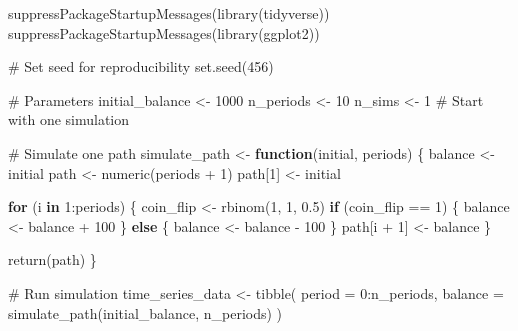 \documentclass[
  letterpaper,
  DIV=11,
  numbers=noendperiod]{scrartcl}
\newenvironment{Shaded}{\begin{snugshade}}{\end{snugshade}}
\newcommand{\AttributeTok}[1]{\textcolor[rgb]{0.40,0.45,0.13}{#1}}
\newcommand{\CommentTok}[1]{\textcolor[rgb]{0.37,0.37,0.37}{#1}}
\newcommand{\ControlFlowTok}[1]{\textcolor[rgb]{0.00,0.23,0.31}{\textbf{#1}}}
\newcommand{\DecValTok}[1]{\textcolor[rgb]{0.68,0.00,0.00}{#1}}
\newcommand{\FloatTok}[1]{\textcolor[rgb]{0.68,0.00,0.00}{#1}}
\newcommand{\FunctionTok}[1]{\textcolor[rgb]{0.28,0.35,0.67}{#1}}
\newcommand{\NormalTok}[1]{\textcolor[rgb]{0.00,0.23,0.31}{#1}}
\newcommand{\OtherTok}[1]{\textcolor[rgb]{0.00,0.23,0.31}{#1}}
\newcommand{\SpecialCharTok}[1]{\textcolor[rgb]{0.37,0.37,0.37}{#1}}
\theoremstyle{definition}
\theoremstyle{remark}
\begin{document}
\begin{Shaded}
\begin{Highlighting}[]
\FunctionTok{suppressPackageStartupMessages}\NormalTok{(}\FunctionTok{library}\NormalTok{(tidyverse))}
\FunctionTok{suppressPackageStartupMessages}\NormalTok{(}\FunctionTok{library}\NormalTok{(ggplot2))}

\CommentTok{\# Set seed for reproducibility}
\FunctionTok{set.seed}\NormalTok{(}\DecValTok{456}\NormalTok{)}

\CommentTok{\# Parameters}
\NormalTok{initial\_balance }\OtherTok{\textless{}{-}} \DecValTok{1000}
\NormalTok{n\_periods }\OtherTok{\textless{}{-}} \DecValTok{10}
\NormalTok{n\_sims }\OtherTok{\textless{}{-}} \DecValTok{1}  \CommentTok{\# Start with one simulation}

\CommentTok{\# Simulate one path}
\NormalTok{simulate\_path }\OtherTok{\textless{}{-}} \ControlFlowTok{function}\NormalTok{(initial, periods) \{}
\NormalTok{  balance }\OtherTok{\textless{}{-}}\NormalTok{ initial}
\NormalTok{  path }\OtherTok{\textless{}{-}} \FunctionTok{numeric}\NormalTok{(periods }\SpecialCharTok{+} \DecValTok{1}\NormalTok{)}
\NormalTok{  path[}\DecValTok{1}\NormalTok{] }\OtherTok{\textless{}{-}}\NormalTok{ initial}
  
  \ControlFlowTok{for}\NormalTok{ (i }\ControlFlowTok{in} \DecValTok{1}\SpecialCharTok{:}\NormalTok{periods) \{}
\NormalTok{    coin\_flip }\OtherTok{\textless{}{-}} \FunctionTok{rbinom}\NormalTok{(}\DecValTok{1}\NormalTok{, }\DecValTok{1}\NormalTok{, }\FloatTok{0.5}\NormalTok{)}
    \ControlFlowTok{if}\NormalTok{ (coin\_flip }\SpecialCharTok{==} \DecValTok{1}\NormalTok{) \{}
\NormalTok{      balance }\OtherTok{\textless{}{-}}\NormalTok{ balance }\SpecialCharTok{+} \DecValTok{100}
\NormalTok{    \} }\ControlFlowTok{else}\NormalTok{ \{}
\NormalTok{      balance }\OtherTok{\textless{}{-}}\NormalTok{ balance }\SpecialCharTok{{-}} \DecValTok{100}
\NormalTok{    \}}
\NormalTok{    path[i }\SpecialCharTok{+} \DecValTok{1}\NormalTok{] }\OtherTok{\textless{}{-}}\NormalTok{ balance}
\NormalTok{  \}}
  
  \FunctionTok{return}\NormalTok{(path)}
\NormalTok{\}}

\CommentTok{\# Run simulation}
\NormalTok{time\_series\_data }\OtherTok{\textless{}{-}} \FunctionTok{tibble}\NormalTok{(}
  \AttributeTok{period =} \DecValTok{0}\SpecialCharTok{:}\NormalTok{n\_periods,}
  \AttributeTok{balance =} \FunctionTok{simulate\_path}\NormalTok{(initial\_balance, n\_periods)}
\NormalTok{)}


\end{Highlighting}
\end{Shaded}
\end{document}
